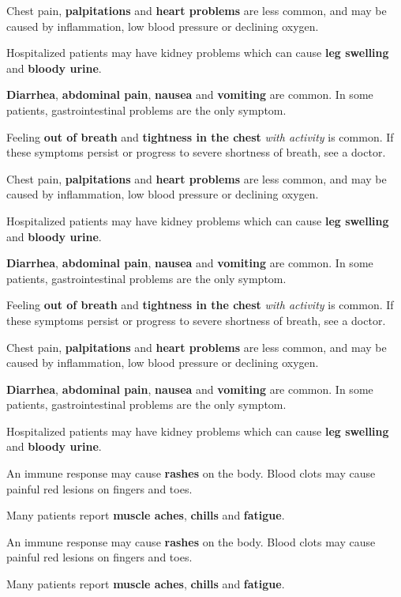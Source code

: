 Chest pain, \textbf{palpitations} and \textbf{heart problems} are less
common, and may be caused by inflammation, low blood pressure or
declining oxygen.

Hospitalized patients may have kidney problems which can cause
\textbf{leg swelling} and \textbf{bloody urine}.

\textbf{Diarrhea}, \textbf{abdominal pain}, \textbf{nausea} and
\textbf{vomiting} are common. In some patients, gastrointestinal
problems are the only symptom.

Feeling \textbf{out of breath} and \textbf{tightness in the chest}
\emph{with activity} is common. If these symptoms persist or progress to
severe shortness of breath, see a doctor.

Chest pain, \textbf{palpitations} and \textbf{heart problems} are less
common, and may be caused by inflammation, low blood pressure or
declining oxygen.

Hospitalized patients may have kidney problems which can cause
\textbf{leg swelling} and \textbf{bloody urine}.

\textbf{Diarrhea}, \textbf{abdominal pain}, \textbf{nausea} and
\textbf{vomiting} are common. In some patients, gastrointestinal
problems are the only symptom.

Feeling \textbf{out of breath} and \textbf{tightness in the chest}
\emph{with activity} is common. If these symptoms persist or progress to
severe shortness of breath, see a doctor.

Chest pain, \textbf{palpitations} and \textbf{heart problems} are less
common, and may be caused by inflammation, low blood pressure or
declining oxygen.

\textbf{Diarrhea}, \textbf{abdominal pain}, \textbf{nausea} and
\textbf{vomiting} are common. In some patients, gastrointestinal
problems are the only symptom.

Hospitalized patients may have kidney problems which can cause
\textbf{leg swelling} and \textbf{bloody urine}.

An immune response may cause \textbf{rashes} on the body. Blood clots
may cause painful red lesions on fingers and toes.

Many patients report \textbf{muscle aches}, \textbf{chills} and
\textbf{fatigue}.

An immune response may cause \textbf{rashes} on the body. Blood clots
may cause painful red lesions on fingers and toes.

Many patients report \textbf{muscle aches}, \textbf{chills} and
\textbf{fatigue}.


